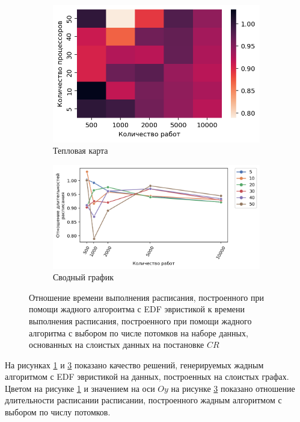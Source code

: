 \begin{figure}[!htbp]
    \centering
    \begin{subfigure}{0.49\textwidth}
        \includegraphics[width=\textwidth]{imgs/layered_class_1/CR_EDF/times.png}
        \caption{Тепловая карта}
        \label{fig:CR-layered-EDF-times-heatmap}
    \end{subfigure}
    \hfill
    \begin{subfigure}{0.49\textwidth}
        \includegraphics[width=\textwidth]{imgs/layered_class_1/CR_EDF/gr_amalgamated.png}
        \caption{Сводный график}
        \label{fig:CR-layered-EDF-times-compiled} 
    \end{subfigure}
    \caption{Отношение времени выполнения расписания, построенного при помощи жадного алгороитма с EDF эвристикой к времени выполнения расписания, построенного при помощи жадного алгоритма с выбором по числе потомков на наборе данных, основанных на слоистых данных на постановке $CR$}
\end{figure}

На рисунках \ref{fig:CR-layered-EDF-times-heatmap} и \ref{fig:CR-layered-EDF-times-compiled} показано качество решений, генерируемых жадным алгоритмом с EDF эвристикой на данных, построенных на слоистых графах. Цветом на рисунке \ref{fig:CR-layered-EDF-times-heatmap} и значением на оси $Oy$ на рисунке \ref{fig:CR-layered-EDF-times-compiled} показано отношение длительности расписании расписании, построенного жадным алгоритмом с выбором по числу потомков.

